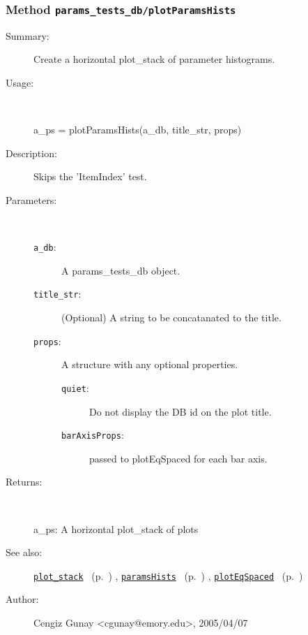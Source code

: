 \subsubsection[Method \texttt{plotParamsHists}]{Method \texttt{params\_tests\_db/plotParamsHists}}%
%
\label{ref_params_tests_db__plotParamsHists}%
\hypertarget{ref_params_tests_db__plotParamsHists}{}%
\begin{description}
\item[Summary:]Create a horizontal plot\_stack of parameter histograms.
%
\item[Usage:]~%
\begin{lyxcode}%
a\_ps = plotParamsHists(a\_db, title\_str, props)
%
\end{lyxcode}%
%
\item[Description:]%
Skips the 'ItemIndex' test.
\item[Parameters:]~
\begin{description}%
\item[\texttt{a\_db}:]
 A params\_tests\_db object.
\item[\texttt{title\_str}:]
 (Optional) A string to be concatanated to the title.
\item[\texttt{props}:]
 A structure with any optional properties.
\begin{description}%
\item[\texttt{quiet}:]
 Do not display the DB id on the plot title.
\item[\texttt{barAxisProps}:]
 passed to plotEqSpaced for each bar axis.
\end{description}%
\end{description}%
%
\item[Returns:]~

	a\_ps: A horizontal plot\_stack of plots
%
%
\item[See also:]%
\hyperlink{ref_plot_stack}{\texttt{plot\_stack}}%
\ (p.~\pageref{ref_plot_stack})%
%
, \hyperlink{ref_paramsHists}{\texttt{paramsHists}}%
\ (p.~\pageref{ref_paramsHists})%
%
, \hyperlink{ref_plotEqSpaced}{\texttt{plotEqSpaced}}%
\ (p.~\pageref{ref_plotEqSpaced})%
%
%
\item[Author:]%
Cengiz Gunay <cgunay@emory.edu>, 2005/04/07%
\end{description}
\methodline%
